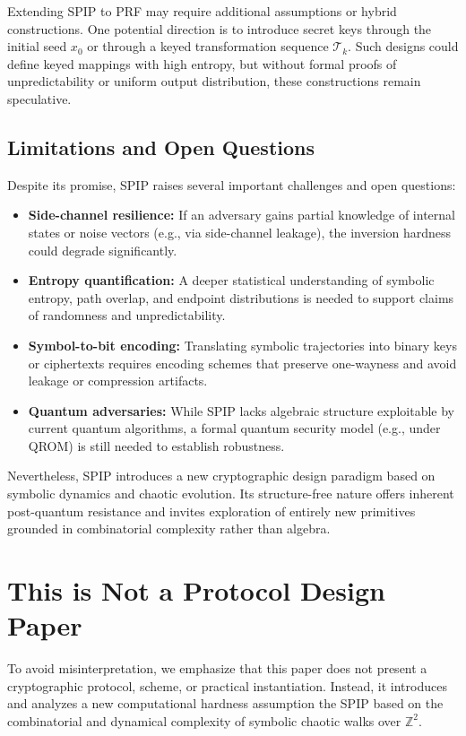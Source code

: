 \documentclass[twocolumn,10pt]{article}
\begin{document}
Extending SPIP to PRF may require additional assumptions or hybrid constructions. One potential direction is to introduce secret keys through the initial seed $x_0$ or through a keyed transformation sequence $\mathcal{T}_k$. Such designs could define keyed mappings with high entropy, but without formal proofs of unpredictability or uniform output distribution, these constructions remain speculative.

\subsection{Limitations and Open Questions}

Despite its promise, SPIP raises several important challenges and open questions:

\begin{itemize}
    \item \textbf{Side-channel resilience:} If an adversary gains partial knowledge of internal states or noise vectors (e.g., via side-channel leakage), the inversion hardness could degrade significantly.
    
    \item \textbf{Entropy quantification:} A deeper statistical understanding of symbolic entropy, path overlap, and endpoint distributions is needed to support claims of randomness and unpredictability.
    
    \item \textbf{Symbol-to-bit encoding:} Translating symbolic trajectories into binary keys or ciphertexts requires encoding schemes that preserve one-wayness and avoid leakage or compression artifacts.
    
    \item \textbf{Quantum adversaries:} While SPIP lacks algebraic structure exploitable by current quantum algorithms, a formal quantum security model (e.g., under QROM) is still needed to establish robustness.
\end{itemize}

Nevertheless, SPIP introduces a new cryptographic design paradigm based on symbolic dynamics and chaotic evolution. Its structure-free nature offers inherent post-quantum resistance and invites exploration of entirely new primitives grounded in combinatorial complexity rather than algebra.


\section*{This is Not a Protocol Design Paper}
\vspace{0.8em}
To avoid misinterpretation, we emphasize that this paper does not present a cryptographic protocol, scheme, or practical instantiation. Instead, it introduces and analyzes a new computational hardness assumption the SPIP based on the combinatorial and dynamical complexity of symbolic chaotic walks over $\mathbb{Z}^2$.
\end{document}

